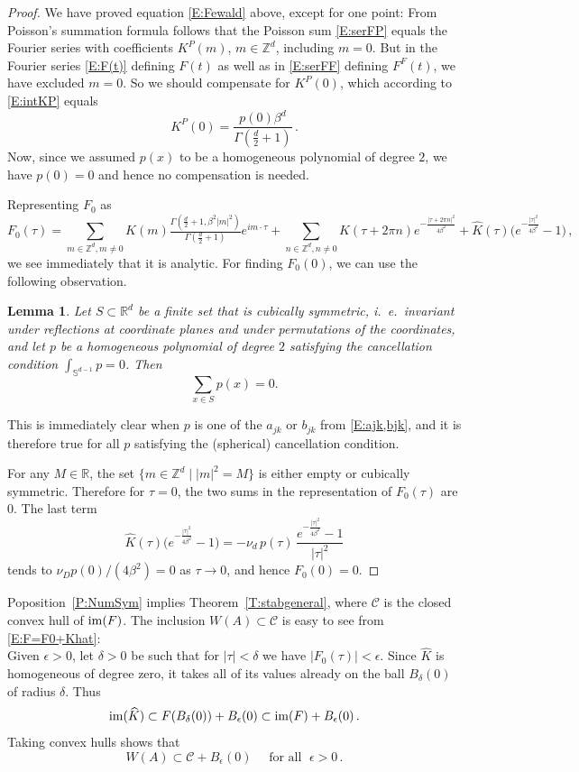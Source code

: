 \documentclass[12pt]{amsart}
\newtheorem{lemma}[theorem]{Lemma}
\theoremstyle{definition}
\theoremstyle{remark}
\numberwithin{equation}{section}
\newcommand{\im}{\operatorname{\rm im}}
\newcommand\R{{\mathbb R}}
\renewcommand\SS{{\mathbb S}}
\newcommand\Z{{\mathbb Z}}
\newcommand\cC{{\mathcal{C}}}
\let\hat=\widehat
\begin{document}
\begin{proof}
We have proved equation \eqref{E:Fewald} above, except for one point: From Poisson's summation formula follows that the Poisson sum \eqref{E:serFP} equals the Fourier series with coefficients $K^{P}(m)$, $m\in\Z^{d}$, including $m=0$. But in the Fourier series \eqref{E:F(t)} defining $F(t)$ as well as in \eqref{E:serFF} defining $F^{F}(t)$, we have excluded $m=0$. So we should compensate for $K^{P}(0)$, which according to \eqref{E:intKP} equals
$$
 K^{P}(0) = \frac{p(0)\beta^{d}}{\Gamma(\frac d2+1)}\,.
$$
Now, since we assumed $p(x)$ to be a homogeneous polynomial of degree $2$, we have $p(0)=0$ and hence no compensation is needed.

Representing $F_{0}$ as
$$
 F_{0}(\tau)=
  \sum_{m\in\Z^{d},m\ne0}K(m)\tfrac{\Gamma(\tfrac d2+1,\beta^{2}|m|^{2})}{\Gamma(\frac d2+1)}e^{im\cdot \tau} +
 \sum_{n\in\Z^{d},n\ne0}\hat K(\tau+2\pi n)e^{-\frac{|\tau+2\pi n|^{2}}{4\beta^{2}}}
 + \hat K(\tau)\big(e^{-\frac{|\tau|^{2}}{4\beta^{2}}}-1\big)\,,
$$
we see immediately that it is analytic. For finding $F_{0}(0)$, we can use the following observation.
\begin{lemma}
 \label{L:cubicsym}
Let $S\subset\R^{d}$ be a finite set that is cubically symmetric, i.\ e.\ invariant under reflections at coordinate planes and under permutations of the coordinates, and let $p$ be a homogeneous polynomial of degree $2$ satisfying the cancellation condition $\int_{\SS^{d-1}}p=0$. Then
$$
 \sum_{x\in S}p(x) = 0.
$$
\end{lemma}
This is immediately clear when $p$ is one of the $a_{jk}$ or $b_{jk}$ from \eqref{E:ajk,bjk}, and it is therefore true for all $p$ satisfying the (spherical) cancellation condition.

For any $M\in\R$, the set $\{m\in\Z^{d}\mid |m|^{2}=M\}$ is either empty or cubically symmetric.
Therefore for $\tau=0$, the two sums in the representation of $F_{0}(\tau)$ are $0$. The last term
$$
 \hat K(\tau)\big(e^{-\frac{|\tau|^{2}}{4\beta^{2}}}-1\big) 
 = -\nu_{d}\,p(\tau)\,\frac{e^{-\frac{|\tau|^{2}}{4\beta^{2}}}-1}{|\tau|^{2}}
$$ 
tends to $\nu_{D}p(0)/(4\beta^{2})=0$ as $\tau\to0$, and hence $F_{0}(0)=0$.
\end{proof}
Poposition~\ref{P:NumSym} implies Theorem~\ref{T:stabgeneral}, where $\cC$ is the closed convex hull of $\im(F)$. The inclusion $W(A)\subset\cC$ is easy to see from \eqref{E:F=F0+Khat}:\\
Given $\epsilon>0$, let $\delta>0$ be such that for $|\tau|<\delta$ we have $|F_{0}(\tau)|<\epsilon$.
Since $\hat K$ is homogeneous of degree zero, it takes all of its values already on the ball $B_{\delta}(0)$ of radius $\delta$. Thus
$$
 \im(\hat K) \subset F(B_{\delta}(0)) + B_{\epsilon}(0) \subset  \im(F) + B_{\epsilon}(0)\,.
$$
Taking convex hulls shows that
$$
 W(A) \subset \cC + B_{\epsilon}(0) \quad\mbox{ for all }\;\epsilon>0\,.
$$
\end{document}
